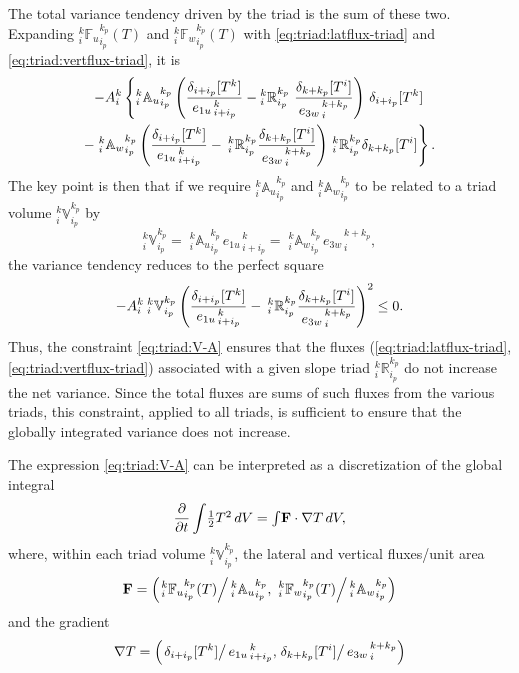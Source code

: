 The total variance tendency driven by the triad is the sum of these
two. Expanding $_i^k{\mathbb{F}_u}_{i_p}^{k_p} (T)$ and
$_i^k{\mathbb{F}_w}_{i_p}^{k_p} (T)$ with \eqref{eq:triad:latflux-triad} and
\eqref{eq:triad:vertflux-triad}, it is
\begin{multline*}
-{A}_i^k\left \{
{ } _i^k{\mathbb{A}_u}_{i_p}^{k_p}
  \left(
    \frac{ \delta_{i+ i_p}[T^k] }{ {e_{1u}}_{\,i + i_p}^{\,k} }
    - {_i^k\mathbb{R}_{i_p}^{k_p}} \
    \frac{ \delta_{k+k_p} [T^i] }{{e_{3w}}_{\,i}^{\,k+k_p} }\right)\,\delta_{i+ i_p}[T^k] \right.\\
- \left. { } _i^k{\mathbb{A}_w}_{i_p}^{k_p}
  \left(
    \frac{ \delta_{i+ i_p}[T^k] }{ {e_{1u}}_{\,i + i_p}^{\,k} }
    -{\:}_i^k\mathbb{R}_{i_p}^{k_p}
    \frac{ \delta_{k+k_p} [T^i] }{{e_{3w}}_{\,i}^{\,k+k_p} }
  \right) {\,}_i^k\mathbb{R}_{i_p}^{k_p}\delta_{k+ k_p}[T^i]
\right \}.
\end{multline*}
The key point is then that if we require
$_i^k{\mathbb{A}_u}_{i_p}^{k_p}$ and $_i^k{\mathbb{A}_w}_{i_p}^{k_p}$
to be related to a triad volume $_i^k\mathbb{V}_{i_p}^{k_p}$ by
\begin{equation}
  \label{eq:triad:V-A}
  _i^k\mathbb{V}_{i_p}^{k_p}
  ={\;}_i^k{\mathbb{A}_u}_{i_p}^{k_p}\,{e_{1u}}_{\,i + i_p}^{\,k}
  ={\;}_i^k{\mathbb{A}_w}_{i_p}^{k_p}\,{e_{3w}}_{\,i}^{\,k + k_p},
\end{equation}
the variance tendency reduces to the perfect square
\begin{equation}
  \label{eq:triad:perfect-square}
  -{A}_i^k{\:} _i^k\mathbb{V}_{i_p}^{k_p}
  \left(
    \frac{ \delta_{i+ i_p}[T^k] }{ {e_{1u}}_{\,i + i_p}^{\,k} }
    -{\:}_i^k\mathbb{R}_{i_p}^{k_p}
    \frac{ \delta_{k+k_p} [T^i] }{{e_{3w}}_{\,i}^{\,k+k_p} }
  \right)^2\leq 0.
\end{equation}
Thus, the constraint \eqref{eq:triad:V-A} ensures that the fluxes (\ref{eq:triad:latflux-triad}, \ref{eq:triad:vertflux-triad}) associated
with a given slope triad $_i^k\mathbb{R}_{i_p}^{k_p}$ do not increase
the net variance. Since the total fluxes are sums of such fluxes from
the various triads, this constraint, applied to all triads, is
sufficient to ensure that the globally integrated variance does not
increase.

The expression \eqref{eq:triad:V-A} can be interpreted as a discretization
of the global integral
\begin{equation}
  \label{eq:triad:cts-var}
  \frac{\partial}{\partial t}\int\!\textstyle\frac{1}{2} T^2\, dV =
  \int\!\mathbf{F}\cdot\nabla T\, dV,
\end{equation}
where, within each triad volume $_i^k\mathbb{V}_{i_p}^{k_p}$, the
lateral and vertical fluxes/unit area
\[
\mathbf{F}=\left(
\left.{}_i^k{\mathbb{F}_u}_{i_p}^{k_p} (T)\right/{}_i^k{\mathbb{A}_u}_{i_p}^{k_p},
\left.{\:}_i^k{\mathbb{F}_w}_{i_p}^{k_p} (T)\right/{}_i^k{\mathbb{A}_w}_{i_p}^{k_p}
 \right)
\]
and the gradient
 \[\nabla T = \left(
\left.\delta_{i+ i_p}[T^k] \right/ {e_{1u}}_{\,i + i_p}^{\,k},
\left.\delta_{k+ k_p}[T^i] \right/ {e_{3w}}_{\,i}^{\,k + k_p}
\right)
\]
